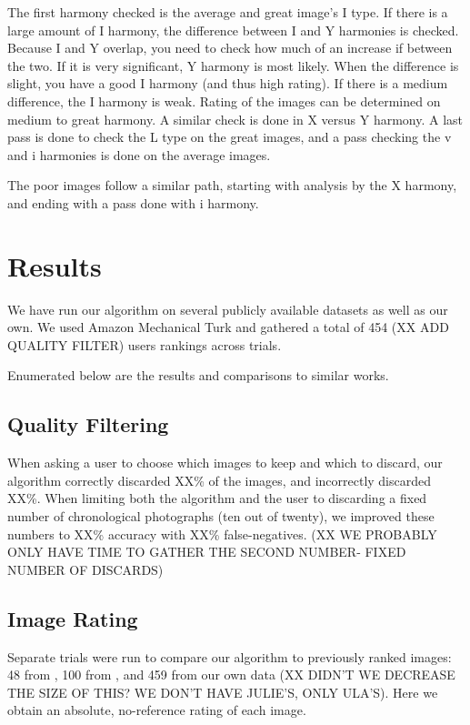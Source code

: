 \documentclass{article}
\begin{document}
The first harmony checked is the average and great image's I type. If there is a large amount of I harmony, the difference between I and Y harmonies is checked. Because I and Y overlap, you need to check how much of an increase if between the two. If it is very significant, Y harmony is most likely. When the difference is slight, you have a good I harmony (and thus high rating). If there is a medium difference, the I harmony is weak. Rating of the images can be determined on medium to great harmony. A similar check is done in X versus Y harmony. A last pass is done to check the L type on the great images, and a pass checking the v and i harmonies is done on the average images.

The poor images follow a similar path, starting with analysis by the X harmony, and ending with a pass done with i harmony.

\section{Results}
We have run our algorithm on several publicly available datasets as well as our own. We used Amazon Mechanical Turk and gathered a total of 454 (XX  ADD QUALITY FILTER) users rankings across trials.

Enumerated below are the results and comparisons to similar works.

\subsection{Quality Filtering} When asking a user to choose which images to keep and which to discard, our algorithm correctly discarded XX\% of the images, and incorrectly discarded XX\%. When limiting both the algorithm and the user to discarding a fixed number of chronological photographs (ten out of twenty), we improved these numbers to XX\% accuracy with XX\% false-negatives. (XX WE PROBABLY ONLY HAVE TIME TO GATHER THE SECOND NUMBER- FIXED NUMBER OF DISCARDS)

\subsection{Image Rating} Separate trials were run to compare our algorithm to previously ranked images: 48 from \cite{1640788}, 100 from \cite{springerlink:10.1007/978-3-540-88690-7_29}, and 459 from our own data (XX DIDN'T WE DECREASE THE SIZE OF THIS? WE DON'T HAVE JULIE'S, ONLY ULA'S). Here we obtain an absolute, no-reference rating of each image.
\end{document}
